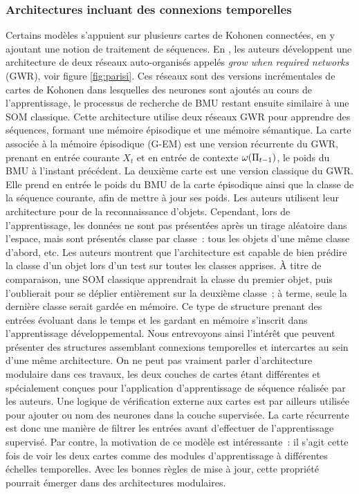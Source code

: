 \documentclass[../main]{subfiles}
\begin{document}
{\subsubsection{Architectures incluant des connexions temporelles}

Certains modèles s'appuient sur plusieurs cartes de Kohonen connectées, en y ajoutant une notion de traitement de séquences.
En \cite{parisiLL}, les auteurs développent une architecture de deux réseaux auto-organisés appelés \emph{grow when required networks} (GWR), voir figure \ref{fig:parisi}. Ces réseaux sont des versions incrémentales de cartes de Kohonen dans lesquelles des neurones sont ajoutés au cours de l'apprentissage, le processus de recherche de BMU restant ensuite similaire à une SOM classique.
Cette architecture utilise deux réseaux GWR pour apprendre des séquences, formant une mémoire épisodique et une mémoire sémantique.
La carte associée à la mémoire épisodique (G-EM) est une version récurrente du GWR, prenant en entrée courante $X_t$ et en entrée de contexte $\omega(\Pi_{t-1})$, le poids du BMU à l'instant précédent.
La deuxième carte est une version classique du GWR. Elle prend en entrée le poids du BMU de la carte épisodique ainsi que la classe de la séquence courante, afin de mettre à jour ses poids.
Les auteurs utilisent leur architecture pour de la reconnaissance d'objets. Cependant, lors de l'apprentissage, les données ne sont pas présentées après un tirage aléatoire dans l'espace, mais sont présentés classe par classe~: tous les objets d'une même classe d'abord, etc. Les auteurs montrent que l'architecture est capable de bien prédire la classe d'un objet lors d'un test sur toutes les classes apprises. \`{A} titre de comparaison, une SOM classique apprendrait la classe du premier objet, puis l'oublierait pour se déplier entièrement sur la deuxième classe~; à terme, seule la dernière classe serait gardée en mémoire.
Ce type de structure prenant des entrées évoluant dans le temps et les gardant en mémoire s'inscrit dans l'apprentissage développemental. Nous entrevoyons ainsi l'intérêt que peuvent présenter des structures assemblant connexions temporelles et intercartes au sein d'une même architecture.
On ne peut pas vraiment parler d'architecture modulaire dans ces travaux, les deux couches de cartes étant différentes et spécialement conçues pour l'application d'apprentissage de séquence réalisée par les auteurs. Une logique de vérification externe aux cartes est par ailleurs utilisée pour ajouter ou nom des neurones dans la couche supervisée. La carte récurrente est donc une manière de filtrer les entrées avant d'effectuer de l'apprentissage supervisé.
Par contre, la motivation de ce modèle est intéressante~: il s'agit cette fois de voir les deux cartes comme des modules d'apprentissage à différentes échelles temporelles. Avec les bonnes règles de mise à jour, cette propriété pourrait émerger dans des architectures modulaires.


}
\end{document}
